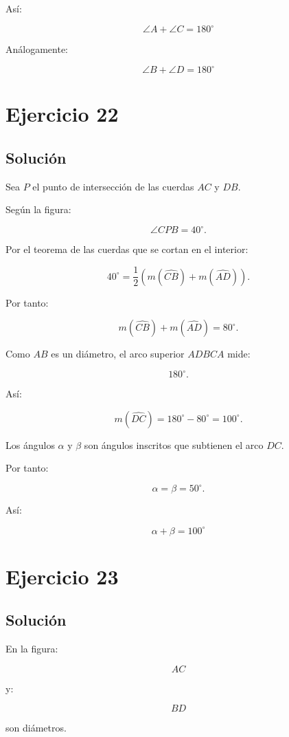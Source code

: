 \documentclass[11pt,a4paper]{article}
\begin{document}
Así:

\[
\boxed{
\angle A+\angle C=180^\circ
}
\]

Análogamente:

\[
\boxed{
\angle B+\angle D=180^\circ
}
\]

\section{Ejercicio 22}
\subsection{Solución}

Sea \(P\) el punto de intersección de las cuerdas \(AC\) y \(DB\).

Según la figura:

\[
\angle CPB=40^\circ.
\]

Por el teorema de las cuerdas que se cortan en el interior:

\[
40^\circ
=
\frac12
\left(
m(\widehat{CB})
+
m(\widehat{AD})
\right).
\]

Por tanto:

\[
m(\widehat{CB})
+
m(\widehat{AD})
=
80^\circ.
\]

Como \(AB\) es un diámetro, el arco superior \(ADBCA\) mide:

\[
180^\circ.
\]

Así:

\[
m(\widehat{DC})
=
180^\circ-80^\circ
=
100^\circ.
\]

Los ángulos \(\alpha\) y \(\beta\) son ángulos inscritos que subtienen el arco \(DC\).

Por tanto:

\[
\alpha=\beta=50^\circ.
\]

Así:

\[
\boxed{
\alpha+\beta=100^\circ
}
\]

\section{Ejercicio 23}
\subsection{Solución}

En la figura:

\[
AC
\]

y:

\[
BD
\]

son diámetros.
\end{document}
